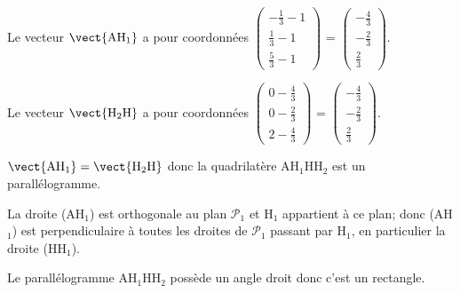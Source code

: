 \begin{enumerate}[resume]
Le vecteur $\vect{\text{AH}_1}$ a pour coordonnées
$\begin{pmatrix}
-\frac{1}{3}-1 \\ \frac{1}{3}-1 \\ \frac{5}{3}-1
\end{pmatrix}$
=
$\begin{pmatrix}
-\frac{4}{3} \\ -\frac{2}{3} \\ \frac{2}{3}
\end{pmatrix}$.

Le vecteur $\vect{\text{H}_2\text{H}}$ a pour coordonnées
$\begin{pmatrix}
0- \frac{4}{3}\\ 0- \frac{2}{3} \\ 2- \frac{4}{3}
\end{pmatrix}$
=
$\begin{pmatrix}
-\frac{4}{3} \\ -\frac{2}{3} \\ \frac{2}{3}
\end{pmatrix}$.

$\vect{\text{AH}_1} = \vect{\text{H}_2\text{H}}$ donc la quadrilatère AH$_1$HH$_2$ est un parallélogramme.

La droite (AH$_1$) est orthogonale au plan $\mathcal{P}_1$ et H$_1$  appartient à ce plan; donc (AH$_1$) est perpendiculaire à toutes les droites de $\mathcal{P}_1$ passant par H$_1$, en particulier la droite (HH$_1$).

Le parallélogramme AH$_1$HH$_2$  possède un angle droit donc c'est un rectangle.

\end{enumerate}

\bigskip
